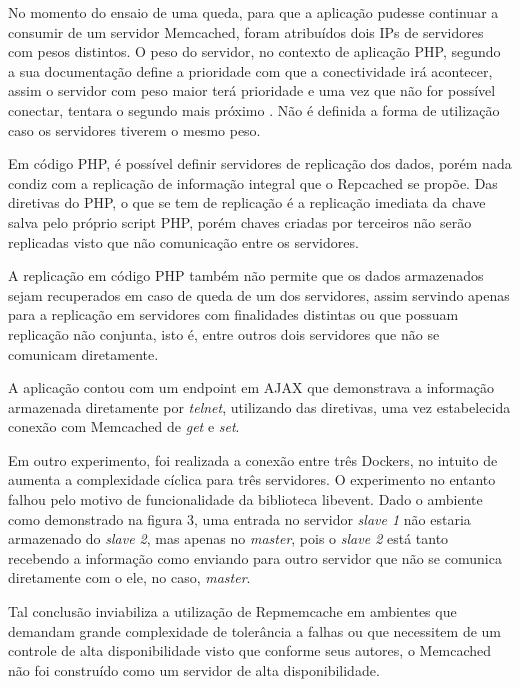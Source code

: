 \documentclass[conference]{IEEEtran}
\begin{document}
No momento do ensaio de uma queda, para que a aplicação pudesse continuar a consumir de um servidor Memcached, foram atribuídos dois IPs de servidores com pesos distintos. O peso do servidor, no contexto de aplicação PHP, segundo a sua documentação define a prioridade com que a conectividade irá acontecer, assim o servidor com peso maior terá prioridade e uma vez que não for possível conectar, tentara o segundo mais próximo \cite{phpmemcachedserver}. Não é definida a forma de utilização caso os servidores tiverem o mesmo peso.

Em código PHP, é possível definir servidores de replicação dos dados, porém nada condiz com a replicação de informação integral que o Repcached se propõe. Das diretivas do PHP, o que se tem de replicação é a replicação imediata da chave salva pelo próprio script PHP, porém chaves criadas por terceiros não serão replicadas visto que não comunicação entre os servidores.

A replicação em código PHP também não permite que os dados armazenados sejam recuperados em caso de queda de um dos servidores, assim servindo apenas para a replicação em servidores com finalidades distintas ou que possuam replicação não conjunta, isto é, entre outros dois servidores que não se comunicam diretamente.

A aplicação contou com um endpoint em AJAX que demonstrava a informação armazenada diretamente por \textit{telnet}, utilizando das diretivas, uma vez estabelecida conexão com Memcached de \textit{get} e \textit{set}.

Em outro experimento, foi realizada a conexão entre três Dockers, no intuito de aumenta a complexidade cíclica para três servidores. O experimento no entanto falhou pelo motivo de funcionalidade da biblioteca libevent. Dado o ambiente como demonstrado na figura 3, uma entrada no servidor \textit{slave 1} não estaria armazenado do \textit{slave 2}, mas apenas no \textit{master}, pois o \textit{slave 2} está tanto recebendo a informação como enviando para outro servidor que não se comunica diretamente com o ele, no caso, \textit{master}. 

Tal conclusão inviabiliza a utilização de Repmemcache em ambientes que demandam grande complexidade de tolerância a falhas ou que necessitem de um controle de alta disponibilidade visto que conforme seus autores, o Memcached não foi construído como um servidor de alta disponibilidade.
\end{document}
